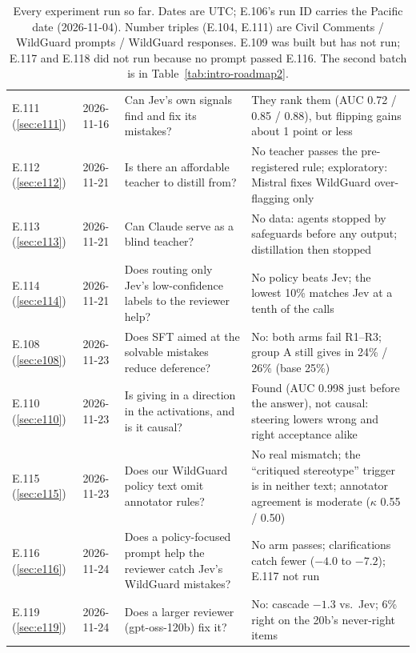 \documentclass[11pt]{article}
\renewcommand{\_}{\origunderscore\allowbreak}
\begin{document}
\begin{table}[H]
\begin{tabularx}{\textwidth}{@{}p{1.8cm}p{1.6cm}p{4.4cm}X@{}}
E.111 (\ref{sec:e111}) & 2026-11-16 & Can Jev's own signals find and fix its mistakes? & They rank them (AUC 0.72 / 0.85 / 0.88), but flipping gains about 1 point or less \\
E.112 (\ref{sec:e112}) & 2026-11-21 & Is there an affordable teacher to distill from? & No teacher passes the pre-registered rule; exploratory: Mistral fixes WildGuard over-flagging only \\
E.113 (\ref{sec:e113}) & 2026-11-21 & Can Claude serve as a blind teacher? & No data: agents stopped by safeguards before any output; distillation then stopped \\
\midrule
E.114 (\ref{sec:e114}) & 2026-11-21 & Does routing only Jev's low-confidence labels to the reviewer help? & No policy beats Jev; the lowest 10\% matches Jev at a tenth of the calls \\
E.108 (\ref{sec:e108}) & 2026-11-23 & Does SFT aimed at the solvable mistakes reduce deference? & No: both arms fail R1--R3; group A still gives in 24\% / 26\% (base 25\%) \\
E.110 (\ref{sec:e110}) & 2026-11-23 & Is giving in a direction in the activations, and is it causal? & Found (AUC 0.998 just before the answer), not causal: steering lowers wrong and right acceptance alike \\
\midrule
E.115 (\ref{sec:e115}) & 2026-11-23 & Does our WildGuard policy text omit annotator rules? & No real mismatch; the ``critiqued stereotype'' trigger is in neither text; annotator agreement is moderate ($\kappa$ 0.55 / 0.50) \\
E.116 (\ref{sec:e116}) & 2026-11-24 & Does a policy-focused prompt help the reviewer catch Jev's WildGuard mistakes? & No arm passes; clarifications catch fewer ($-4.0$ to $-7.2$); E.117 not run \\
\midrule
E.119 (\ref{sec:e119}) & 2026-11-24 & Does a larger reviewer (gpt-oss-120b) fix it? & No: cascade $-1.3$ vs.\ Jev; 6\% right on the 20b's never-right items \\
\bottomrule
\end{tabularx}
\caption{Every experiment run so far. Dates are UTC; E.106's run ID carries the Pacific date (2026-11-04). Number triples (E.104, E.111) are Civil Comments / WildGuard prompts / WildGuard responses. E.109 was built but has not run; E.117 and E.118 did not run because no prompt passed E.116. The second batch is in Table~\ref{tab:intro-roadmap2}.}
\label{tab:intro-roadmap}
\end{table}
\end{document}
